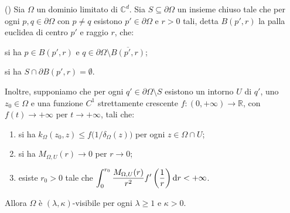\begin{thm} \label{extvis}
    (\cite[Theorem 1.9]{CMS}) Sia $\Omega$ un dominio limitato di $\mathbb{C}^d$. Sia $S\subseteq\partial\Omega$ un insieme chiuso tale che per ogni $p,q\in\partial\Omega$ con $p\not=q$ esistono $p'\in\partial\Omega$ e $r>0$ tali, detta $B(p',r)$ la palla euclidea di centro $p'$ e raggio $r$, che:
    \begin{nlist}
        \item si ha $p\in B(p',r)$ e $q\in\partial\Omega\setminus\overline{B(p',r)}$;
        \item si ha $S\cap\partial B(p',r)=\emptyset$.
    \end{nlist}
    
    Inoltre, supponiamo che per ogni $q'\in\partial\Omega\setminus S$ esistono un intorno $U$ di $q'$, uno $z_0\in\Omega$ e una funzione $C^1$ strettamente crescente $f:(0,+\infty)\longrightarrow\mathbb{R}$, con $f(t)\longrightarrow+\infty$ per $t\longrightarrow+\infty$, tali che:
    \begin{enumerate}[label={(\arabic*)}]
        \item si ha $k_\Omega(z_0,z) \le f\big(1/\delta_\Omega(z)\big)$ per ogni $z\in\Omega\cap U$;
        \item si ha $M_{\Omega,U}(r)\longrightarrow 0$ per $r\longrightarrow 0$;
        \item esiste $r_0>0$ tale che $\displaystyle\int_0^{r_0}\frac{M_{\Omega,U}(r)}{r^2}f'\left(\frac{1}{r}\right)\mathop{}\!\mathrm{d} r<+\infty$.
    \end{enumerate}

    Allora $\Omega$ è $(\lambda,\kappa)$-visibile per ogni $\lambda \ge 1$ e $\kappa>0$.
\end{thm}

